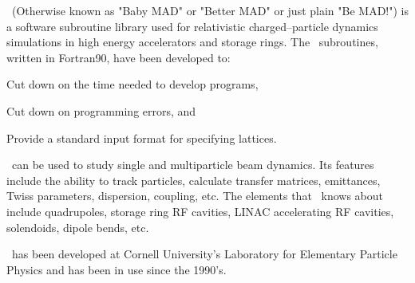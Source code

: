
\bmad\ (Otherwise known as "Baby MAD" or "Better MAD" or just plain "Be MAD!")
is a software subroutine library used for relativistic
charged--particle dynamics simulations in high energy accelerators and
storage rings. The \bmad\ subroutines, written in
Fortran90, have been developed to:
\begin{Itemize}
\item Cut down on the time needed to develop programs,
\item Cut down on programming errors, and
\item Provide a standard input format for specifying lattices.
\end{Itemize}

\bmad\ can be used to study single and multiparticle beam dynamics. Its 
features include the ability to track particles, calculate transfer matrices,
emittances, Twiss parameters, 
dispersion, coupling, etc. The elements that \bmad\ knows about include
quadrupoles, storage ring RF cavities, LINAC accelerating RF cavities, 
solendoids, dipole bends, etc. 

\bmad\ has been developed at Cornell University's Laboratory for Elementary
Particle Physics and has been in use since the 1990's. 
\vfill
\break

